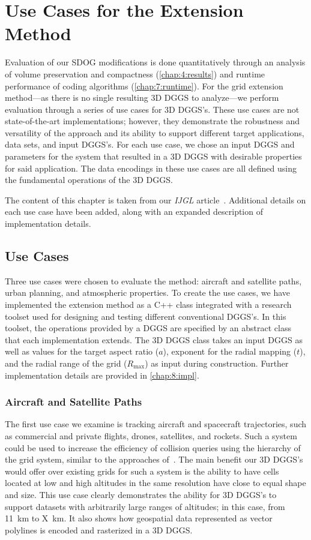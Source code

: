 \chapter{Use Cases for the Extension Method} \label{chap:usecases}
Evaluation of our SDOG modifications is done quantitatively through an analysis of volume preservation and compactness (\cref{chap:4:results}) and runtime performance of coding algorithms (\cref{chap:7:runtime}).
For the grid extension method---as there is no single resulting 3D DGGS to analyze---we perform evaluation through a series of use cases for 3D DGGS's.
These use cases are not state-of-the-art implementations; however, they demonstrate the robustness and versatility of the approach and its ability to support different target applications, data sets, and input DGGS's.
For each use case, we chose an input DGGS and parameters for the system that resulted in a 3D DGGS with desirable properties for said application.
The data encodings in these use cases are all defined using the fundamental operations of the 3D DGGS.


The content of this chapter is taken from our \textit{IJGL} article~\cite{ulmer2020general}.
Additional details on each use case have been added, along with an expanded description of implementation details.


\section{Use Cases}
Three use cases were chosen to evaluate the method: aircraft and satellite paths, urban planning, and atmospheric properties.
To create the use cases, we have implemented the extension method as a C++ class integrated with a research toolset used for designing and testing different conventional DGGS's.
In this toolset, the operations provided by a DGGS are specified by an abstract class that each implementation extends.
The 3D DGGS class takes an input DGGS as well as values for the target aspect ratio ($a$), exponent for the radial mapping ($t$), and the radial range of the grid ($R_\mathrm{max}$) as input during construction.
Further implementation details are provided in \cref{chap:8:impl}.


\subsection{Aircraft and Satellite Paths} \label{chap:8:sats}
The first use case we examine is tracking aircraft and spacecraft trajectories, such as commercial and private flights, drones, satellites, and rockets.
Such a system could be used to increase the efficiency of collision queries using the hierarchy of the grid system, similar to the approaches of~\cite{miao2019low, zhai2019collision}.
The main benefit our 3D DGGS's would offer over existing grids for such a system is the ability to have cells located at low and high altitudes in the same resolution have close to equal shape and size.
This use case clearly demonstrates the ability for 3D DGGS's to support datasets with arbitrarily large ranges of altitudes; in this case, from 11~km to X~km.
It also shows how geospatial data represented as vector polylines is encoded and rasterized in a 3D DGGS.


